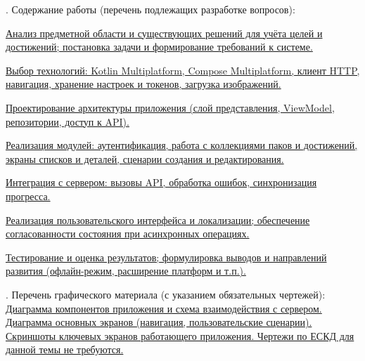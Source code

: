 \vspace{1ex}

. Содержание работы (перечень подлежащих разработке вопросов):

\vspace{1ex}

\noindent
\uline{Анализ предметной области и существующих решений для учёта целей и достижений; постановка задачи и формирование требований к системе.}

\vspace{1ex}

\noindent
\uline{Выбор технологий: Kotlin Multiplatform, Compose Multiplatform, клиент HTTP, навигация, хранение настроек и токенов, загрузка изображений.}

\vspace{1ex}

\noindent
\uline{Проектирование архитектуры приложения (слой представления, ViewModel, репозитории, доступ к API).}

\vspace{1ex}

\noindent
\uline{Реализация модулей: аутентификация, работа с коллекциями паков и достижений, экраны списков и деталей, сценарии создания и редактирования.}

\vspace{1ex}

\noindent
\uline{Интеграция с сервером: вызовы API, обработка ошибок, синхронизация прогресса.}

\vspace{1ex}

\noindent
\uline{Реализация пользовательского интерфейса и локализации; обеспечение согласованности состояния при асинхронных операциях.}

\vspace{1ex}

\noindent
\uline{Тестирование и оценка результатов; формулировка выводов и направлений развития (офлайн-режим, расширение платформ и т.п.).}

\vspace{2ex}

. Перечень графического материала (с указанием обязательных чертежей): \uline{Диаграмма компонентов приложения и схема взаимодействия с сервером. Диаграмма основных экранов (навигация, пользовательские сценарии). Скриншоты ключевых экранов работающего приложения. Чертежи по ЕСКД для данной темы не требуются.}

\vspace{1ex}

